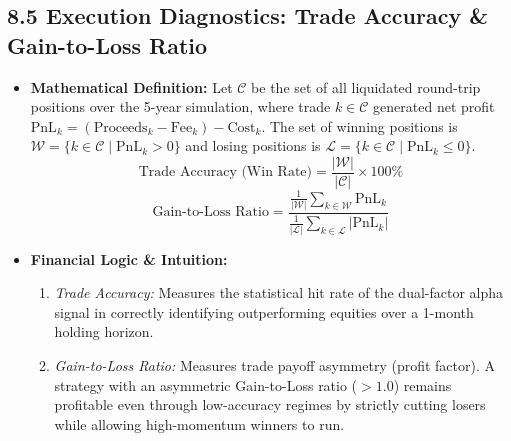 \documentclass[11pt,a4paper]{article}
\begin{document}
\subsection{8.5 Execution Diagnostics: Trade Accuracy \& Gain-to-Loss Ratio}
\begin{itemize}[leftmargin=1.5em]
    \item \textbf{Mathematical Definition:} Let $\mathcal{C}$ be the set of all liquidated round-trip positions over the 5-year simulation, where trade $k \in \mathcal{C}$ generated net profit $\text{PnL}_k = (\text{Proceeds}_k - \text{Fee}_k) - \text{Cost}_k$. The set of winning positions is $\mathcal{W} = \{k \in \mathcal{C} \mid \text{PnL}_k > 0\}$ and losing positions is $\mathcal{L} = \{k \in \mathcal{C} \mid \text{PnL}_k \le 0\}$.
    \begin{equation}
        \text{Trade Accuracy (Win Rate)} = \frac{|\mathcal{W}|}{|\mathcal{C}|} \times 100\%
    \end{equation}
    \begin{equation}
        \text{Gain-to-Loss Ratio} = \frac{\frac{1}{|\mathcal{W}|}\sum_{k \in \mathcal{W}} \text{PnL}_k}{\frac{1}{|\mathcal{L}|}\sum_{k \in \mathcal{L}} |\text{PnL}_k|}
    \end{equation}
    \item \textbf{Financial Logic \& Intuition:} 
    \begin{enumerate}[label=(\alph*), itemsep=0.1em]
        \item \textit{Trade Accuracy:} Measures the statistical hit rate of the dual-factor alpha signal in correctly identifying outperforming equities over a 1-month holding horizon.
        \item \textit{Gain-to-Loss Ratio:} Measures trade payoff asymmetry (profit factor). A strategy with an asymmetric Gain-to-Loss ratio ($>1.0$) remains profitable even through low-accuracy regimes by strictly cutting losers while allowing high-momentum winners to run.
    \end{enumerate}
\end{itemize}
\end{document}
